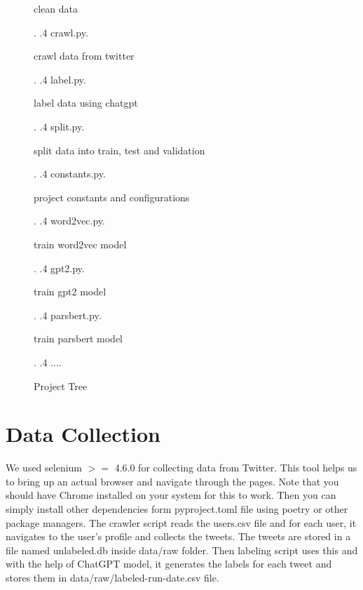 \documentclass[12pt, letterpaper]{article}
\begin{document}
\begin{figure}[H]
{\begin{minipage}[t]{5cm}
                                    clean data
            \end{minipage}.
            .4 crawl.py.\dotfill\begin{minipage}[t]{5cm}
                                    crawl data from twitter
            \end{minipage}.
            .4 label.py.\dotfill\begin{minipage}[t]{5cm}
                                    label data using chatgpt
            \end{minipage}.
            .4 split.py.\dotfill\begin{minipage}[t]{5cm}
                                    split data into train, test and validation
            \end{minipage}.
            .4 constants.py.\dotfill\begin{minipage}[t]{5cm}
                                        project constants and configurations
            \end{minipage}.
            .4 word2vec.py.\dotfill\begin{minipage}[t]{5cm}
                                       train word2vec model
            \end{minipage}.
            .4 gpt2.py.\dotfill\begin{minipage}[t]{5cm}
                                   train gpt2 model
            \end{minipage}.
            .4 parsbert.py.\dotfill\begin{minipage}[t]{5cm}
                                       train parsbert model
            \end{minipage}.
            .4 ....
        }
        \caption{Project Tree}
    \end{figure}


    \section{Data Collection}\label{sec:data-collection}
    We used selenium $>=$ 4.6.0 for collecting data from Twitter. This tool helps us to bring up an actual browser and navigate through the pages. Note that you should have Chrome installed on your system for this to work. Then you can simply install other dependencies form pyproject.toml file using poetry or other package managers.
    The crawler script reads the users.csv file and for each user, it navigates to the user's profile and collects the tweets. The tweets are stored in a file named unlabeled.db inside data\slash raw folder. Then labeling script uses this and with the help of ChatGPT model, it generates the labels for each tweet and stores them in data\slash raw\slash labeled-run-date.csv file.
\end{document}
